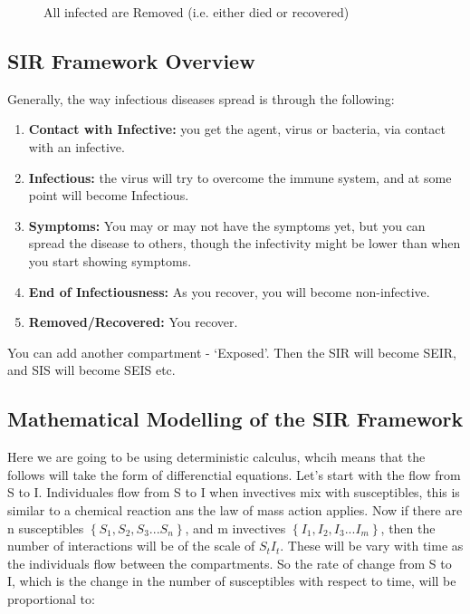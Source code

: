 \documentclass[fontsize=17pt]{article}
\begin{document}
\begin{figure}
	\begin{center}
	\end{center}
	
	\caption{All infected are Removed (i.e. either died or recovered)}
	\label{fig: end_removed}
\end{figure}

\subsection{SIR Framework Overview}

Generally, the way infectious diseases spread is through the following:
\begin{enumerate}
	\item \textbf{Contact with Infective: }you get the agent, virus or bacteria, via contact with an infective. 
	\item \textbf{Infectious: }the virus will try to overcome the immune system, and at some point will become Infectious. 
	\item \textbf{Symptoms: }You may or may not have the symptoms yet, but you can spread the disease to others, though the infectivity might be lower than when you start showing symptoms.
	\item \textbf{End of Infectiousness: }As you recover, you will become non-infective.
	\item \textbf{Removed/Recovered: }You recover.
\end{enumerate}
You can add another compartment - `Exposed'. Then the SIR will become SEIR, and SIS will become SEIS etc.

\subsection{Mathematical Modelling of the SIR Framework}

Here we are going to be using deterministic calculus, whcih means that the follows will take the form of differenctial equations. Let's start with the flow from S to I. Individuales flow from S to I when invectives mix with susceptibles, this is similar to a chemical reaction ans the law of mass action applies. Now if there are n susceptibles $\left\lbrace S_{1}, S_{2}, S_{3}... S_{n} \right\rbrace$, and m invectives $\left\lbrace I_{1}, I_{2}, I_{3}... I_{m} \right\rbrace$, then the number of interactions will be of the scale of $S_{t}I_{t}$. These will be vary with time as the individuals flow between the compartments. So the rate of change from S to I, which is the change in the number of susceptibles with respect to time, will be proportional to:
\end{document}
